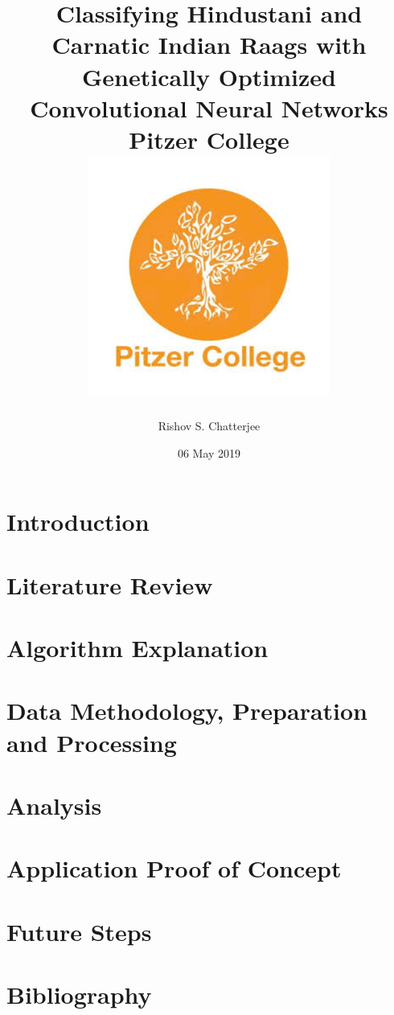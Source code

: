 \documentclass[12pt]{report}
\title{
{Classifying Hindustani and Carnatic Indian Raags with Genetically Optimized Convolutional Neural Networks}\\
{\large Pitzer College}\\
{\includegraphics{university_1.png}}
}
\author{Rishov S. Chatterjee}
\date{06 May 2019}
\begin{document}
\maketitle{}
\chapter{Introduction}


\chapter{Literature Review}


\chapter{Algorithm Explanation}


\chapter{Data Methodology, Preparation and Processing}


\chapter{Analysis}


\chapter{Application Proof of Concept}


\chapter{Future Steps}


\chapter{Bibliography}

\end{document}
